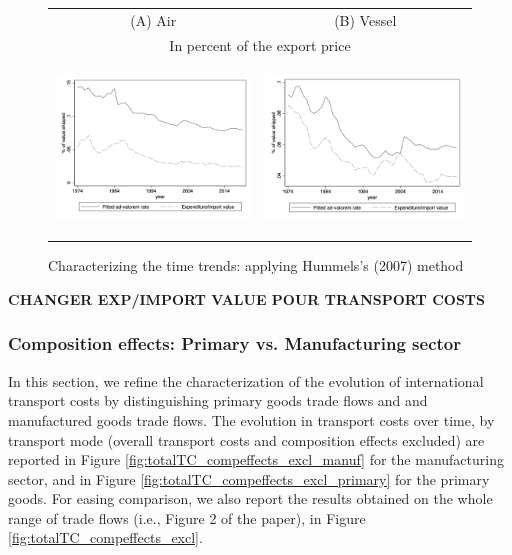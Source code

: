 \documentclass[11pt,twoside, authoryear]{elsarticle}
\begin{document}
\begin{figure}[htbp]
\caption{Characterizing the time trends: applying Hummels's (2007) method }
\label{fig:comp_effects_as_in_Hummels}
\begin{center}
\begin{tabular}{cc}
{\small (A) Air } & {\small (B) Vessel }\\
\multicolumn{2}{c}{{\small In percent of the export price}} \\
\includegraphics[width=2.5in, height=1.8in]{figure5_comme_hummels.jpg}
& \includegraphics[width=2.5in,height=1.8in]{figure6_comme_hummels.jpg} \\
\end{tabular}
\end{center}
\end{figure}

\textbf{CHANGER EXP/IMPORT VALUE POUR TRANSPORT COSTS}

\subsubsection{Composition effects: Primary vs. Manufacturing sector}

In this section, we refine the characterization of the evolution of international transport costs by distinguishing primary goods trade flows and and manufactured goods trade flows. The evolution in transport costs over time, by transport mode (overall transport costs and composition effects excluded) are reported in Figure \ref{fig:totalTC_compeffects_excl_manuf} for the manufacturing sector, and in Figure \ref{fig:totalTC_compeffects_excl_primary} for the primary goods. For easing comparison, we also report the results obtained on the whole range of trade flows (i.e., Figure 2 of the paper), in Figure \ref{fig:totalTC_compeffects_excl}.
\end{document}
